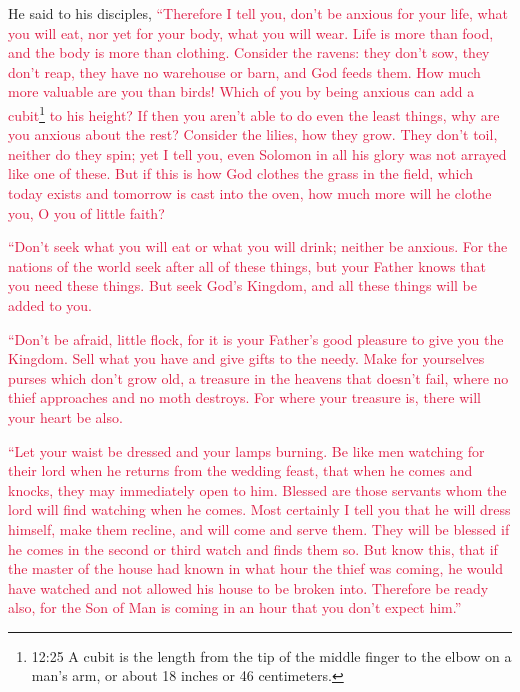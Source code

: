 \myverse{}He said to his disciples,
\textcolor{crimson}{“Therefore I tell you, don’t be anxious for your life, what you will eat, nor yet for your body, what
	you will wear.
}
\myverse{}\textcolor{crimson}{Life is more than food, and the body is more than clothing.
}
\myverse{}\textcolor{crimson}{Consider the ravens: they don’t sow, they don’t reap, they have no warehouse
	or barn, and God feeds them. How much more valuable are you than birds!
}
\myverse{}\textcolor{crimson}{Which of you by being anxious can add a cubit}\footnote{12:25 A cubit is the length from the tip of the middle finger to the elbow on a man’s arm, or about
	18 inches or 46 centimeters.}
\textcolor{crimson}{to his height?
}
\myverse{}\textcolor{crimson}{If then you aren’t able to do even the least things, why are you anxious
	about the rest?
}
\myverse{}\textcolor{crimson}{Consider the lilies, how they grow. They don’t toil, neither do they
	spin; yet I tell you, even Solomon in all his glory was not arrayed like one of these.
}
\myverse{}\textcolor{crimson}{But if this is how God clothes the grass in the field, which today exists
	and tomorrow is cast into the oven, how much more will he clothe you, O you of little faith?
}

\myverse{}\textcolor{crimson}{“Don’t seek what you will eat or what you will drink; neither
	be anxious.
}
\myverse{}\textcolor{crimson}{For the nations of the world seek after all of these things, but your
	Father knows that you need these things.
}
\myverse{}\textcolor{crimson}{But seek God’s Kingdom, and all these things will be added to you.}

\myverse{}\textcolor{crimson}{“Don’t be afraid, little flock, for it is your Father’s
	good pleasure to give you the Kingdom.
}
\myverse{}\textcolor{crimson}{Sell what you have and give gifts to the needy. Make for yourselves purses
	which don’t grow old, a treasure in the heavens that doesn’t fail, where no thief approaches and no moth
	destroys.
}
\myverse{}\textcolor{crimson}{For where your treasure is, there will your heart be also.
}

\myverse{}\textcolor{crimson}{“Let your waist be dressed and your lamps burning.
}
\myverse{}\textcolor{crimson}{Be like men watching for their lord when he returns from the wedding
	feast, that when he comes and knocks, they may immediately open to him.
}
\myverse{}\textcolor{crimson}{Blessed are those servants whom the lord will find watching when he comes.
	Most certainly I tell you that he will dress himself, make them recline, and will come and serve them.
}
\myverse{}\textcolor{crimson}{They will be blessed if he comes in the second or third watch and finds
	them so.
}
\myverse{}\textcolor{crimson}{But know this, that if the master of the house had known in what hour
	the thief was coming, he would have watched and not allowed his house to be broken into.
}
\myverse{}\textcolor{crimson}{Therefore be ready also, for the Son of Man is coming in an hour that
	you don’t expect him.”}

